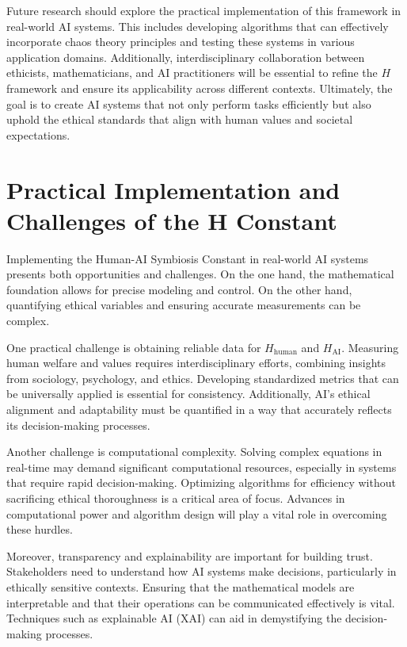 \documentclass[12pt]{article}
\begin{document}
Future research should explore the practical implementation of this framework in real-world AI systems. This includes developing algorithms that can effectively incorporate chaos theory principles and testing these systems in various application domains. Additionally, interdisciplinary collaboration between ethicists, mathematicians, and AI practitioners will be essential to refine the \(H\) framework and ensure its applicability across different contexts. Ultimately, the goal is to create AI systems that not only perform tasks efficiently but also uphold the ethical standards that align with human values and societal expectations.

\newpage


\section{Practical Implementation and Challenges of the H Constant}

Implementing the Human-AI Symbiosis Constant in real-world AI systems presents both opportunities and challenges. On the one hand, the mathematical foundation allows for precise modeling and control. On the other hand, quantifying ethical variables and ensuring accurate measurements can be complex.

One practical challenge is obtaining reliable data for $H_{\text{human}}$ and $H_{\text{AI}}$. Measuring human welfare and values requires interdisciplinary efforts, combining insights from sociology, psychology, and ethics. Developing standardized metrics that can be universally applied is essential for consistency. Additionally, AI's ethical alignment and adaptability must be quantified in a way that accurately reflects its decision-making processes.

Another challenge is computational complexity. Solving complex equations in real-time may demand significant computational resources, especially in systems that require rapid decision-making. Optimizing algorithms for efficiency without sacrificing ethical thoroughness is a critical area of focus. Advances in computational power and algorithm design will play a vital role in overcoming these hurdles.

Moreover, transparency and explainability are important for building trust. Stakeholders need to understand how AI systems make decisions, particularly in ethically sensitive contexts. Ensuring that the mathematical models are interpretable and that their operations can be communicated effectively is vital. Techniques such as explainable AI (XAI) can aid in demystifying the decision-making processes.
\end{document}
